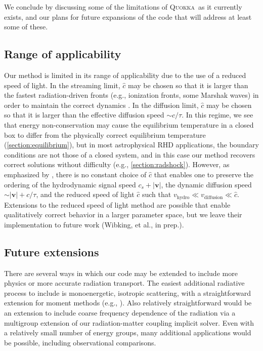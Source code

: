 \documentclass[fleqn,usenatbib]{mnras}
\newcommand{\vc}[1]{{\mathbf{#1}}}
\newcommand{\quokka}{\textsc{Quokka}}
\begin{document}
We conclude by discussing some of the limitations of \quokka~as it currently exists, and our plans for future expansions of the code that will address at least some of these.

\subsection{Range of applicability}
Our method is limited in its range of applicability due to the use of a reduced speed of light. In the streaming limit, $\hat c$ may be chosen so that it is larger than the fastest radiation-driven fronts (e.g., ionization fronts, some Marshak waves) in order to maintain the correct dynamics \citep{Gnedin_2001}. In the diffusion limit, $\hat c$ may be chosen so that it is larger than the effective diffusion speed $\sim c / \tau$. In this regime, we see that energy non-conservation may cause the equilibrium temperature in a closed box to differ from the physically correct equilibrium temperature (\autoref{section:equilibrium}), but in most astrophysical RHD applications, the boundary conditions are not those of a closed system, and in this case our method recovers correct solutions without difficulty (e.g., \autoref{section:radshock}). However, as emphasized by \cite{Skinner_2013}, there is no constant choice of $\hat c$ that enables one to preserve the ordering of the hydrodynamic signal speed $c_s + |\vc{v}|$, the dynamic diffusion speed $\sim |\vc{v}| + c / \tau$, and the reduced speed of light $\hat c$ such that $v_{\text{hydro}} \ll v_{\text{diffusion}} \ll \hat c$. Extensions to the reduced speed of light method are possible that enable qualitatively correct behavior in a larger parameter space, but we leave their implementation to future work (Wibking, et al., in prep.).

\subsection{Future extensions}
There are several ways in which our code may be extended to include more physics or more accurate radiation transport. The easiest additional radiative process to include is monoenergetic, isotropic scattering, with a straightforward extension for moment methods (e.g., \citealt{Jiang12a}). Also relatively straightforward would be an extension to include coarse frequency dependence of the radiation via a multigroup extension of our radiation-matter coupling implicit solver. Even with a relatively small number of energy groups, many additional applications would be possible, including observational comparisons.
\end{document}

